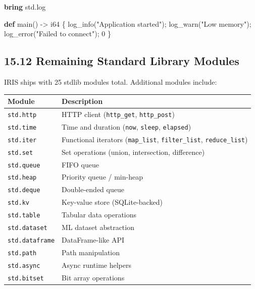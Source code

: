 \documentclass[
  english,
]{book}
\newenvironment{Shaded}{\begin{snugshade}}{\end{snugshade}}
\newcommand{\DataTypeTok}[1]{\textcolor[rgb]{0.31,0.79,0.69}{#1}}
\newcommand{\DecValTok}[1]{\textcolor[rgb]{0.71,0.81,0.66}{#1}}
\newcommand{\FunctionTok}[1]{\textcolor[rgb]{0.86,0.86,0.67}{#1}}
\newcommand{\KeywordTok}[1]{\textcolor[rgb]{0.34,0.61,0.84}{\textbf{#1}}}
\newcommand{\NormalTok}[1]{\textcolor[rgb]{0.83,0.83,0.83}{#1}}
\newcommand{\OperatorTok}[1]{\textcolor[rgb]{0.83,0.83,0.83}{#1}}
\newcommand{\StringTok}[1]{\textcolor[rgb]{0.81,0.57,0.47}{#1}}
\begin{document}
\begin{Shaded}
\begin{Highlighting}[]
\KeywordTok{bring}\NormalTok{ std}\OperatorTok{.}\FunctionTok{log}

\KeywordTok{def}\NormalTok{ main() }\OperatorTok{{-}\textgreater{}} \DataTypeTok{i64}\NormalTok{ \{}
\NormalTok{    log\_info(}\StringTok{"Application started"}\NormalTok{);}
\NormalTok{    log\_warn(}\StringTok{"Low memory"}\NormalTok{);}
\NormalTok{    log\_error(}\StringTok{"Failed to connect"}\NormalTok{);}
    \DecValTok{0}
\NormalTok{\}}
\end{Highlighting}
\end{Shaded}

\subsection{15.12 Remaining Standard Library
Modules}\label{remaining-standard-library-modules}

IRIS ships with 25 stdlib modules total. Additional modules include:

\begin{longtable}[]{@{}
  >{\raggedright\arraybackslash}p{}
  >{\raggedright\arraybackslash}p{}@{}}
\toprule\noalign{}
\begin{minipage}[b]{\linewidth}\raggedright
Module
\end{minipage} & \begin{minipage}[b]{\linewidth}\raggedright
Description
\end{minipage} \\
\midrule\noalign{}
\endhead
\bottomrule\noalign{}
\endlastfoot
\texttt{std.http} & HTTP client (\texttt{http\_get},
\texttt{http\_post}) \\
\texttt{std.time} & Time and duration (\texttt{now}, \texttt{sleep},
\texttt{elapsed}) \\
\texttt{std.iter} & Functional iterators (\texttt{map\_list},
\texttt{filter\_list}, \texttt{reduce\_list}) \\
\texttt{std.set} & Set operations (union, intersection, difference) \\
\texttt{std.queue} & FIFO queue \\
\texttt{std.heap} & Priority queue / min-heap \\
\texttt{std.deque} & Double-ended queue \\
\texttt{std.kv} & Key-value store (SQLite-backed) \\
\texttt{std.table} & Tabular data operations \\
\texttt{std.dataset} & ML dataset abstraction \\
\texttt{std.dataframe} & DataFrame-like API \\
\texttt{std.path} & Path manipulation \\
\texttt{std.async} & Async runtime helpers \\
\texttt{std.bitset} & Bit array operations \\
\end{longtable}
\end{document}
